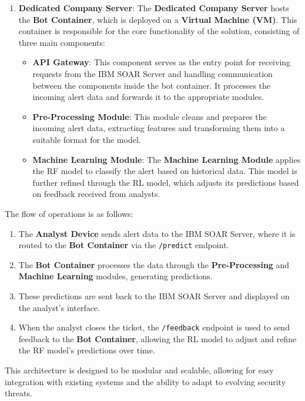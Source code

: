 \begin{enumerate}
    \item \textbf{Dedicated Company Server}: The \textbf{Dedicated Company Server} hosts the \textbf{Bot Container}, which is deployed on a \textbf{Virtual Machine (VM)}. This container is responsible for the core functionality of the solution, consisting of three main components:
    \begin{itemize}
        \item \textbf{API Gateway}: This component serves as the entry point for receiving requests from the IBM SOAR Server and handling communication between the components inside the bot container. It processes the incoming alert data and forwards it to the appropriate modules.
        \item \textbf{Pre-Processing Module}: This module cleans and prepares the incoming alert data, extracting features and transforming them into a suitable format for the model.
        \item \textbf{Machine Learning Module}: The \textbf{Machine Learning Module} applies the \gls{RF} model to classify the alert based on historical data. This model is further refined through the \gls{RL} model, which adjusts its predictions based on feedback received from analysts.
    \end{itemize}
\end{enumerate}

The flow of operations is as follows:
\begin{enumerate}
    \item The \textbf{Analyst Device} sends alert data to the IBM SOAR Server, where it is routed to the \textbf{Bot Container} via the \texttt{/predict} endpoint.
    \item The \textbf{Bot Container} processes the data through the \textbf{Pre-Processing} and \textbf{Machine Learning} modules, generating predictions.
    \item These predictions are sent back to the IBM SOAR Server and displayed on the analyst’s interface.
    \item When the analyst closes the ticket, the \texttt{/feedback} endpoint is used to send feedback to the \textbf{Bot Container}, allowing the \gls{RL} model to adjust and refine the \gls{RF} model’s predictions over time.
\end{enumerate}

This architecture is designed to be modular and scalable, allowing for easy integration with existing systems and the ability to adapt to evolving security threats.


